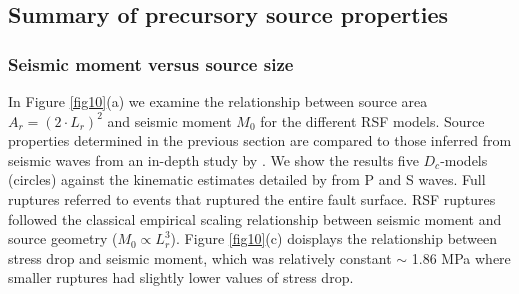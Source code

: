 \documentclass[preprint,1p, 10pt,authoryear]{elsarticle}
\begin{document}
\subsection{Summary of precursory source properties}
\subsubsection{Seismic moment versus source size}
In Figure \ref{fig10}(a) we examine the relationship between source area $A_{r} = (2\cdot L_{r})^{2}$ and seismic moment $M_{0}$ for the different RSF models. Source properties determined in the previous section are compared to those inferred from seismic waves from an in-depth study by \citet{Selvadurai2019}. We show the results five $D_{c}$-models (circles) against the kinematic estimates detailed by \citet{Selvadurai2019} from P and S waves.  Full ruptures referred to events that ruptured the entire fault surface. RSF ruptures followed the classical empirical scaling relationship between seismic moment and source geometry ($M_{0} \propto L_{r}^{3}$). Figure \ref{fig10}(c) doisplays the relationship between stress drop and seismic moment, which was relatively constant $\sim$ 1.86 MPa where smaller ruptures had slightly lower values of stress drop.
\end{document}
